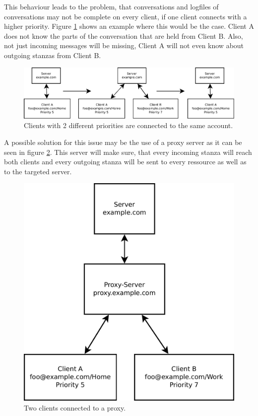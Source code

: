 \documentclass[a4paper,10pt,numbers=noendperiod]{scrartcl}
\begin{document}
This behaviour leads to the problem, that conversations and logfiles of conversations may not be complete on every client, if one client connects with a higher priority. Figure \ref{fig:2clients} shows an example where this would be the case. Client A does not know the parts of the conversation that are held from Client B. Also, not just incoming messages will be missing, Client A will not even know about outgoing stanzas from Client B. 
\begin{figure}[h!]
	\begin{center}
		\includegraphics[scale=0.6]{figures/diagram1.pdf}
	\end{center}
	\caption{Clients with 2 different priorities are connected to the same account.}
	\label{fig:2clients}
\end{figure}


A possible solution for this issue may be the use of a proxy server as it can be seen in figure \ref{fig:2clientsproxy}. This server will make sure, that every incoming stanza will reach both clients and every outgoing stanza will be sent to every ressource as well as to the targeted server.

\begin{figure}[h!]
	\begin{center}
		\includegraphics[scale=0.4]{figures/diagram3.pdf}
	\end{center}
	\caption{Two clients connected to a proxy.}
	\label{fig:2clientsproxy}
\end{figure}
\end{document}
